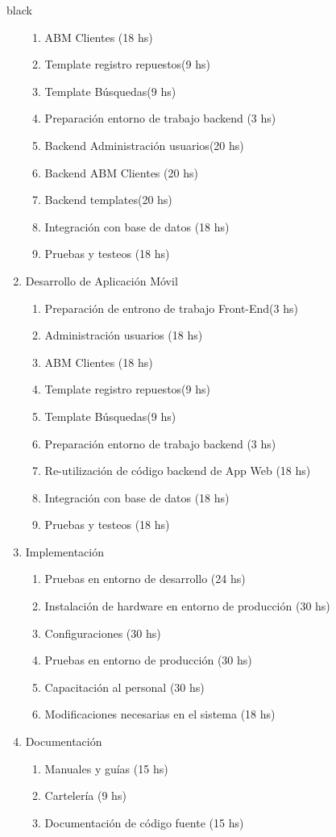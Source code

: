\documentclass[11pt]{charter}
\begin{document}
\begin{consigna}{black}
\begin{enumerate}
\begin{enumerate}
	\item ABM Clientes (18 hs)
	\item Template registro repuestos(9 hs)
	\item Template Búsquedas(9 hs)
	\item Preparación entorno de trabajo backend (3 hs)
	\item Backend Administración usuarios(20 hs)
	\item Backend ABM Clientes (20 hs)
	\item Backend templates(20 hs)
	\item Integración con base de datos (18 hs)
	\item Pruebas y testeos (18 hs)
	\end{enumerate}
\item Desarrollo de Aplicación Móvil
	\begin{enumerate}
	\item Preparación de entrono de trabajo Front-End(3 hs)
	\item Administración usuarios (18 hs)
	\item ABM Clientes (18 hs)
	\item Template registro repuestos(9 hs)
	\item Template Búsquedas(9 hs)
	\item Preparación entorno de trabajo backend (3 hs)
	\item Re-utilización de código backend de App Web (18 hs)
	\item Integración con base de datos (18 hs)
	\item Pruebas y testeos (18 hs)
	\end{enumerate}
\item Implementación
	\begin{enumerate}
	\item Pruebas en entorno de desarrollo  (24 hs)
	\item Instalación de hardware en entorno de producción (30 hs)
	\item Configuraciones (30 hs)
	\item Pruebas en entorno de producción (30 hs)
	\item Capacitación al personal (30 hs)
	\item Modificaciones necesarias en el sistema (18 hs)
	\end{enumerate}
\item Documentación
	\begin{enumerate}
	\item Manuales y guías  (15 hs)
	\item Cartelería (9 hs)
	\item Documentación de código fuente (15 hs)
	\end{enumerate}



\end{enumerate}
\end{consigna}
\end{document}
